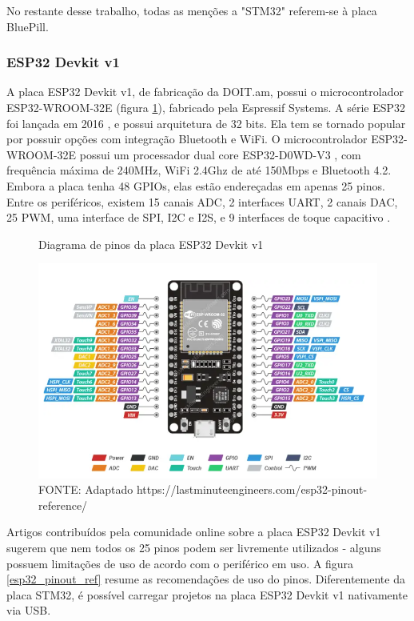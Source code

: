No restante desse trabalho, todas as menções a "STM32" referem-se à placa
BluePill.


\subsubsection{ESP32 Devkit v1}

A placa ESP32 Devkit v1, de fabricação da DOIT.am, possui o microcontrolador
ESP32-WROOM-32E (figura \ref{esp32_pinout}), fabricado pela Espressif Systems.
A série ESP32 foi lançada em 2016 \cite{anuncio_esp32}, e possui arquitetura de
32 bits. Ela tem se tornado popular por possuir opções com integração Bluetooth
e WiFi. O microcontrolador ESP32-WROOM-32E possui um processador dual core
ESP32-D0WD-V3 \cite{esp32_wroom_32e_datasheet}, com frequência máxima de 240MHz,
WiFi 2.4Ghz de até 150Mbps e Bluetooth 4.2. Embora a placa tenha 48 GPIOs, elas
estão endereçadas em apenas 25 pinos. Entre os periféricos, existem 15 canais
ADC, 2 interfaces UART, 2 canais DAC, 25 PWM, uma interface de SPI, I2C e I2S,
e 9 interfaces de toque capacitivo
\cite{esp32_reference_2} \cite{esp32_reference}.

\begin{figure}[ht]
	\centering
	\caption{Diagrama de pinos da placa ESP32 Devkit v1}
	\includegraphics[width=1.0\textwidth]{figures/esp32_pinout}
	\caption*{FONTE: Adaptado https://lastminuteengineers.com/esp32-pinout-reference/}
	\label{esp32_pinout}
\end{figure}

Artigos contribuídos pela comunidade online sobre a placa ESP32 Devkit v1 
\cite{esp32_reference_2} \cite{esp32_reference} sugerem que nem todos os 25
pinos podem ser livremente utilizados - alguns possuem limitações de uso de
acordo com o periférico em uso. A figura \ref{esp32_pinout_ref} resume as
recomendações de uso do pinos. Diferentemente da placa STM32, é possível
carregar projetos na placa ESP32 Devkit v1 nativamente via USB.

